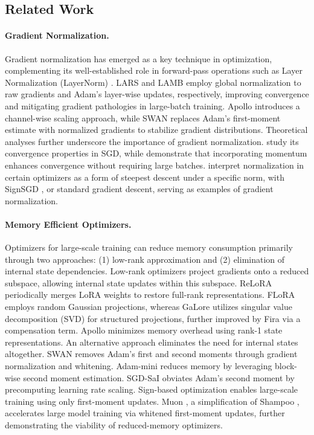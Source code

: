 \subsection{Related Work}

\paragraph{Gradient Normalization.} Gradient normalization has emerged as a key technique in optimization, complementing its well-established role in forward-pass operations such as Layer Normalization (LayerNorm) \citep{Ba2016LayerN}. LARS and LAMB \citep{you2017lars, you2019lamb} employ global normalization to raw gradients and Adam's layer-wise updates, respectively, improving convergence and mitigating gradient pathologies in large-batch training. Apollo \citep{zhu2024apollo} introduces a channel-wise scaling approach, while SWAN \citep{ma2024swansgdnormalizationwhitening} replaces Adam's first-moment estimate with normalized gradients to stabilize gradient distributions. Theoretical analyses further underscore the importance of gradient normalization. \citet{hazan2015beyond} study its convergence properties in SGD, while \citet{cutkosky2020momentum} demonstrate that incorporating momentum enhances convergence without requiring large batches. \citet{bernstein2024old} interpret normalization in certain optimizers as a form of steepest descent under a specific norm, with SignSGD \citep{bernstein2018signsgd}, or standard gradient descent, serving as examples of gradient normalization.

\paragraph{Memory Efficient Optimizers.} Optimizers for large-scale training can reduce memory consumption primarily through two approaches: (1) low-rank approximation and (2) elimination of internal state dependencies. Low-rank optimizers project gradients onto a reduced subspace, allowing internal state updates within this subspace. ReLoRA \citep{Lialin2023ReLoRAHT} periodically merges LoRA \citep{hu2021lora} weights to restore full-rank representations. FLoRA \citep{Hao2024FloraLA} employs random Gaussian projections, whereas GaLore \citep{Zhao2024GaLoreML} utilizes singular value decomposition (SVD) for structured projections, further improved by Fira \citep{chen2024fira} via a compensation term. Apollo \citep{zhu2024apollo} minimizes memory overhead using rank-1 state representations. An alternative approach eliminates the need for internal states altogether. SWAN \citep{ma2024swansgdnormalizationwhitening} removes Adam's first and second moments through gradient normalization and whitening. Adam-mini \citep{zhang2024adam} reduces memory by leveraging block-wise second moment estimation. SGD-SaI \citep{xu2024no} obviates Adam’s second moment by precomputing learning rate scaling. Sign-based optimization \citep{chen2024symbolic} enables large-scale training using only first-moment updates. Muon \citep{jordan2024muon}, a simplification of Shampoo \citep{gupta2018shampoopreconditionedstochastictensor}, accelerates large model training via whitened first-moment updates, further demonstrating the viability of reduced-memory optimizers.


